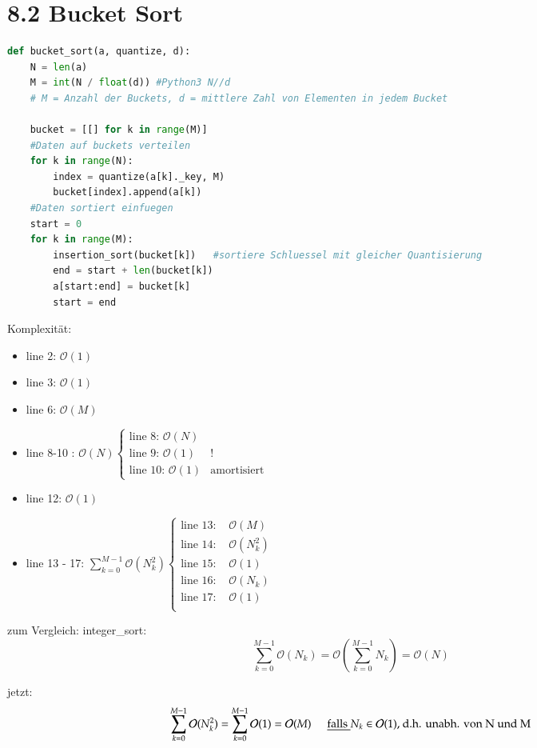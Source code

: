 \documentclass[11pt, fleqn]{scrreprt}
\begin{document}
\section*{8.2 Bucket Sort}

\begin{lstlisting}[language=Python]
def bucket_sort(a, quantize, d):
	N = len(a)
	M = int(N / float(d)) #Python3 N//d
	# M = Anzahl der Buckets, d = mittlere Zahl von Elementen in jedem Bucket
	
	bucket = [[] for k in range(M)]
	#Daten auf buckets verteilen
	for k in range(N):
		index = quantize(a[k]._key, M)
		bucket[index].append(a[k])
	#Daten sortiert einfuegen
	start = 0
	for k in range(M):
		insertion_sort(bucket[k])	#sortiere Schluessel mit gleicher Quantisierung
		end = start + len(bucket[k])
		a[start:end] = bucket[k]
		start = end
\end{lstlisting}
Komplexität:
\begin{itemize}
	\item line 2: $\mathcal{O}(1)$
	\item line 3: $\mathcal{O}(1)$
	\item line 6: $\mathcal{O}(M)$
	\item line 8-10 : $\mathcal{O}(N) \begin{cases}\text{line 8: } \mathcal{O}(N) & \\ \text{line 9: } \mathcal{O}(1) & ! \\ \text{line 10: }  \mathcal{O}(1) & \text{amortisiert}\end{cases}$
	\item line 12: $\mathcal{O}(1)$
	\item line 13 - 17: $\sum_{k=0}^{M-1} \mathcal{O}(N_k^2) \begin{cases} \text{line 13: } & \mathcal{O}(M) \\ \text{line 14: } & \mathcal{O}(N_k^2) \\  \text{line 15: } & \mathcal{O}(1)  \\\text{line 16: } & \mathcal{O}(N_k) \\  \text{line 17: } & \mathcal{O}(1) \\ \end{cases}$
\end{itemize}
zum Vergleich: integer\_sort:
\[ \sum_{k=0}^{M-1} \mathcal{O}(N_k) = \mathcal{O}\left( \sum_{k=0}^{M-1} N_k\right) = \mathcal{O}(N)\]

jetzt:
\[ \sum_{k=0}^{M-1} \mathcal{O}(N_k^2) = \sum_{k=0}^{M-1} \mathcal{O}(1) = \mathcal{O}(M) \hspace*{0.5cm} \underline{\text{falls }} N_k \in \mathcal{O}(1) \text{, d.h. unabh. von N und M} \]
\end{document}
